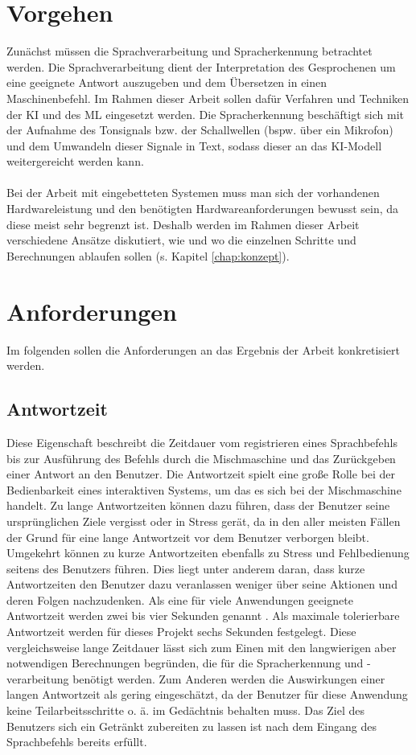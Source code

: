 \section{Vorgehen}
Zunächst müssen die Sprachverarbeitung und Spracherkennung betrachtet werden. Die Sprachverarbeitung dient der Interpretation des Gesprochenen um eine geeignete Antwort auszugeben und dem Übersetzen in einen Maschinenbefehl. Im Rahmen dieser Arbeit sollen dafür Verfahren und Techniken der \ac{KI} und des \ac{ML} eingesetzt werden. Die Spracherkennung beschäftigt sich mit der Aufnahme des Tonsignals bzw. der Schallwellen (bspw. über ein Mikrofon) und dem Umwandeln dieser Signale in Text, sodass dieser an das \ac{KI}-Modell weitergereicht werden kann.\\\\
Bei der Arbeit mit eingebetteten Systemen muss man sich der vorhandenen Hardwareleistung und den benötigten Hardwareanforderungen bewusst sein, da diese meist sehr begrenzt ist. Deshalb werden im Rahmen dieser Arbeit verschiedene Ansätze diskutiert, wie und wo die einzelnen Schritte und Berechnungen ablaufen sollen (s. Kapitel \ref{chap:konzept}).

\section{Anforderungen}
Im folgenden sollen die Anforderungen an das Ergebnis der Arbeit konkretisiert werden.
\subsection{Antwortzeit}
Diese Eigenschaft beschreibt die Zeitdauer vom registrieren eines Sprachbefehls bis zur Ausführung des Befehls durch die Mischmaschine und das Zurückgeben einer Antwort an den Benutzer. Die Antwortzeit spielt eine große Rolle bei der Bedienbarkeit eines interaktiven Systems, um das es sich bei der Mischmaschine handelt. Zu lange Antwortzeiten können dazu führen, dass der Benutzer seine ursprünglichen Ziele vergisst oder in Stress gerät, da in den aller meisten Fällen der Grund für eine lange Antwortzeit vor dem Benutzer verborgen bleibt. Umgekehrt können zu kurze Antwortzeiten ebenfalls zu Stress und Fehlbedienung seitens des Benutzers führen. Dies liegt unter anderem daran, dass kurze Antwortzeiten den Benutzer dazu veranlassen weniger über seine Aktionen und deren Folgen nachzudenken. Als eine für viele Anwendungen geeignete Antwortzeit werden zwei bis vier Sekunden genannt \cite{herczeg_9_2018}. Als maximale tolerierbare Antwortzeit werden für dieses Projekt sechs Sekunden festgelegt. Diese vergleichsweise lange Zeitdauer lässt sich zum Einen mit den langwierigen aber notwendigen Berechnungen begründen, die für die Spracherkennung und -verarbeitung benötigt werden. Zum Anderen werden die Auswirkungen einer langen Antwortzeit als gering eingeschätzt, da der Benutzer für diese Anwendung keine Teilarbeitsschritte o. ä. im Gedächtnis behalten muss. Das Ziel des Benutzers sich ein Getränkt zubereiten zu lassen ist nach dem Eingang des Sprachbefehls bereits erfüllt.
